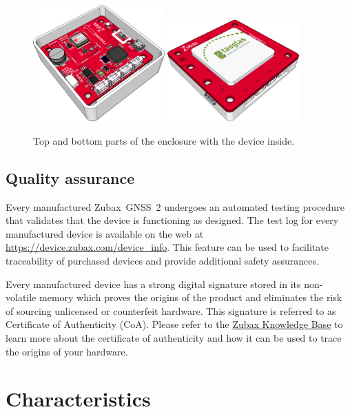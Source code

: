 \documentclass{zubaxdoc}
\begin{document}
\begin{figure}[hbt]
	\centering
	\includegraphics[width=0.45\textwidth]{enclosure_pcb_top}
	\includegraphics[width=0.45\textwidth]{enclosure_pcb_bottom}
	\caption{Top and bottom parts of the enclosure with the device inside.}
\end{figure}

\section{Quality assurance}

Every manufactured Zubax~GNSS~2 undergoes an automated testing procedure that validates that
the device is functioning as designed.
The test log for every manufactured device is available on the web at
\url{https://device.zubax.com/device_info}.
This feature can be used to facilitate traceability of purchased devices and
provide additional safety assurances.

Every manufactured device has a strong digital signature stored in its non-volatile memory
which proves the origins of the product and eliminates the risk of sourcing unlicensed or
counterfeit hardware.
This signature is referred to as Certificate of Authenticity (CoA).
Please refer to the \href{https://kb.zubax.com}{Zubax Knowledge Base} to learn more about
the certificate of authenticity and how it can be used to trace the origins of your hardware.

\chapter{Characteristics}
\end{document}
